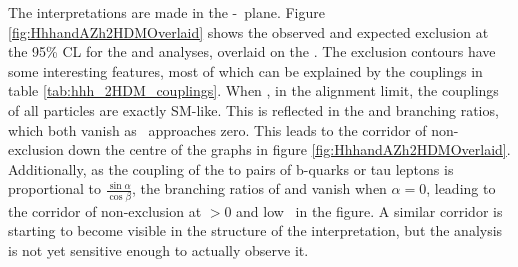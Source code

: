 The interpretations are made in the \cosba-\tanb~plane. Figure \ref{fig:HhhandAZh2HDMOverlaid}
shows the observed and expected exclusion at the 95\% \ac{CL} for the \Htohh
and \AtoZh analyses, overlaid on the \xsbr.
The exclusion contours have some interesting features, most of which can be explained by the couplings
in table \ref{tab:hhh_2HDM_couplings}. When , in the alignment limit, the couplings
of all particles are exactly \ac{SM}-like. This is reflected in the \Htohh and \AtoZh branching ratios, 
which both vanish as \cosba~approaches zero. This leads to the corridor of non-exclusion down the 
centre of the graphs in figure \ref{fig:HhhandAZh2HDMOverlaid}. Additionally,
as the coupling of the \PHiggslight to pairs of b-quarks or tau leptons is proportional 
to $\frac{\sin{\alpha}}{\cos{\beta}}$, the branching ratios of \Htohhtobbtautau
and \AtoZhtolltautau vanish when $\alpha = 0$, leading to the corridor of non-exclusion
at \cosba $ > 0$ and low \tanb~in the \AtoZh figure. A similar corridor is starting
to become visible in the \xsbr structure of the \Htohh interpretation, but
the analysis is not yet sensitive enough to actually observe it.

